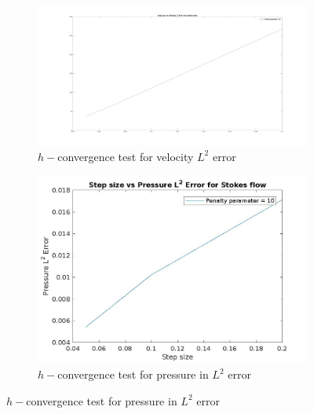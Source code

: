 \documentclass[a4paper,openany]{book}
\begin{document}
\begin{figure}
\begin{subfigure}{\textwidth}	
  \includegraphics[width=\linewidth]{l2_velocity_stokes.jpg}
  \caption{$h-$convergence test for velocity $L^2$ error}
  \label{fig:vel_stoke_conv}
\end{subfigure}
\begin{subfigure}{\textwidth}	
  \includegraphics[width=\linewidth]{l2_pressure_stokes.jpg}
  \caption{$h-$convergence test for pressure in $L^2$ error}
  \label{fig:pre_stoke_conv}
\end{subfigure}
\end{figure}
\end{document}
